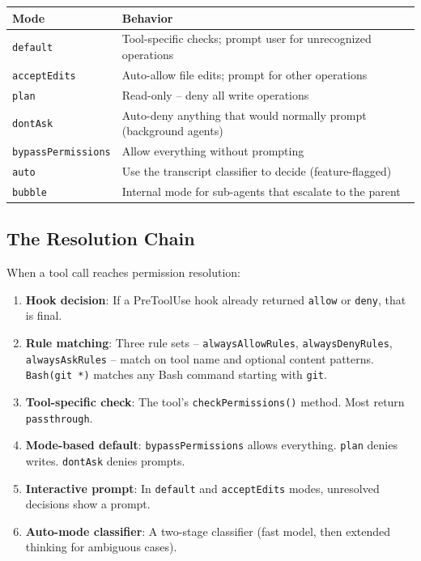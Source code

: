 \documentclass[
  english,
  11pt,
  letterpaper,
]{book}
\providecommand{\tightlist}{%
  \setlength{\itemsep}{0pt}\setlength{\parskip}{0pt}}
\begin{document}
\begin{longtable}[]{@{}
  >{\raggedright\arraybackslash}p{}
  >{\raggedright\arraybackslash}p{}@{}}
\toprule\noalign{}
\begin{minipage}[b]{\linewidth}\raggedright
Mode
\end{minipage} & \begin{minipage}[b]{\linewidth}\raggedright
Behavior
\end{minipage} \\
\midrule\noalign{}
\endhead
\bottomrule\noalign{}
\endlastfoot
\texttt{default} & Tool-specific checks; prompt user for unrecognized
operations \\
\texttt{acceptEdits} & Auto-allow file edits; prompt for other
operations \\
\texttt{plan} & Read-only -- deny all write operations \\
\texttt{dontAsk} & Auto-deny anything that would normally prompt
(background agents) \\
\texttt{bypassPermissions} & Allow everything without prompting \\
\texttt{auto} & Use the transcript classifier to decide
(feature-flagged) \\
\texttt{bubble} & Internal mode for sub-agents that escalate to the
parent \\
\end{longtable}

\subsection{The Resolution Chain}\label{the-resolution-chain}

When a tool call reaches permission resolution:

\begin{enumerate}
\def\labelenumi{\arabic{enumi}.}
\tightlist
\item
  \textbf{Hook decision}: If a PreToolUse hook already returned
  \texttt{allow} or \texttt{deny}, that is final.
\item
  \textbf{Rule matching}: Three rule sets -- \texttt{alwaysAllowRules},
  \texttt{alwaysDenyRules}, \texttt{alwaysAskRules} -- match on tool
  name and optional content patterns. \texttt{Bash(git\ *)} matches any
  Bash command starting with \texttt{git}.
\item
  \textbf{Tool-specific check}: The tool's \texttt{checkPermissions()}
  method. Most return \texttt{passthrough}.
\item
  \textbf{Mode-based default}: \texttt{bypassPermissions} allows
  everything. \texttt{plan} denies writes. \texttt{dontAsk} denies
  prompts.
\item
  \textbf{Interactive prompt}: In \texttt{default} and
  \texttt{acceptEdits} modes, unresolved decisions show a prompt.
\item
  \textbf{Auto-mode classifier}: A two-stage classifier (fast model,
  then extended thinking for ambiguous cases).
\end{enumerate}
\end{document}
